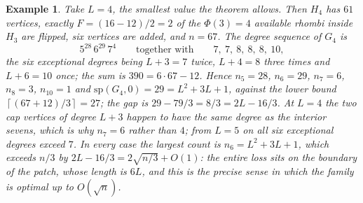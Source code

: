 \documentclass[10pt,a4paper]{article}
\newtheorem{example}[theorem]{Example}
\begin{document}
\begin{example}
\label{Ex_hexL4}Take $L=4$, the smallest value the theorem allows. Then $H_{4}$
has $61$ vertices, exactly $F=(16-12)/2=2$ of the $\Phi (3)=4$ available rhombi
inside $H_{3}$ are flipped, six vertices are added, and $n=67$. The degree
sequence of $G_{4}$ is
\[
5^{28}\,6^{29}\,7^{4}\qquad \text{together with}\qquad 7,\ 7,\ 8,\ 8,\ 8,\ 10,
\]
the six exceptional degrees being $L+3=7$ twice, $L+4=8$ three times and
$L+6=10$ once; the sum is $390=6\cdot 67-12$. Hence $n_{5}=28$, $n_{6}=29$,
$n_{7}=6$, $n_{8}=3$, $n_{10}=1$ and
$\mathrm{sp}(G_{4},0)=29=L^{2}+3L+1$, against the lower bound
$\left\lceil (67+12)/3\right\rceil =27$; the gap is $29-79/3=8/3=2L-16/3$.
At $L=4$ the two cap vertices of degree $L+3$ happen to have the same degree as
the interior sevens, which is why $n_{7}=6$ rather than $4$; from $L=5$ on all
six exceptional degrees exceed $7$. In every case the largest count is
$n_{6}=L^{2}+3L+1$, which exceeds $n/3$ by $2L-16/3=2\sqrt{n/3}+O(1)$: the
entire loss sits on the boundary of the patch, whose length is $6L$, and this is
the precise sense in which the family is optimal up to $O(\sqrt{n})$.
\end{example}
%
\end{document}

